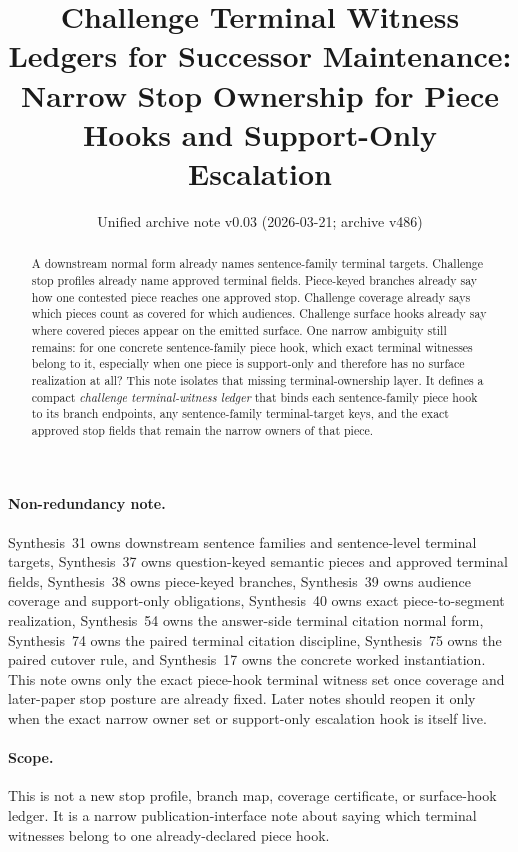 \documentclass[11pt]{article}
\title{Challenge Terminal Witness Ledgers for Successor Maintenance:\\[0.5ex]
\large Narrow Stop Ownership for Piece Hooks and Support-Only Escalation}
\author{}
\date{Unified archive note v0.03 (2026-03-21; archive v486)}
\begin{document}
\maketitle

\begin{abstract}
A downstream normal form already names sentence-family terminal targets.
Challenge stop profiles already name approved terminal fields.
Piece-keyed branches already say how one contested piece reaches one approved stop.
Challenge coverage already says which pieces count as covered for which audiences.
Challenge surface hooks already say where covered pieces appear on the emitted surface.
One narrow ambiguity still remains: for one concrete sentence-family piece hook, which exact terminal witnesses belong to it, especially when one piece is support-only and therefore has no surface realization at all?
This note isolates that missing terminal-ownership layer.
It defines a compact \emph{challenge terminal-witness ledger} that binds each sentence-family piece hook to its branch endpoints, any sentence-family terminal-target keys, and the exact approved stop fields that remain the narrow owners of that piece.
\end{abstract}

\paragraph{Non-redundancy note.}
Synthesis~31 owns downstream sentence families and sentence-level terminal targets, Synthesis~37 owns question-keyed semantic pieces and approved terminal fields, Synthesis~38 owns piece-keyed branches, Synthesis~39 owns audience coverage and support-only obligations, Synthesis~40 owns exact piece-to-segment realization, Synthesis~54 owns the answer-side terminal citation normal form, Synthesis~74 owns the paired terminal citation discipline, Synthesis~75 owns the paired cutover rule, and Synthesis~17 owns the concrete worked instantiation.
This note owns only the exact piece-hook terminal witness set once coverage and later-paper stop posture are already fixed. Later notes should reopen it only when the exact narrow owner set or support-only escalation hook is itself live.
\paragraph{Scope.}
This is not a new stop profile, branch map, coverage certificate, or surface-hook ledger.
It is a narrow publication-interface note about saying which terminal witnesses belong to one already-declared piece hook.
\end{document}
